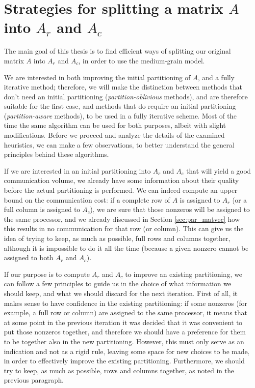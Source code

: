 \chapter{Strategies for splitting a matrix $A$ into $A_r$ and $A_c$} \label{chap:methods}

The main goal of this thesis is to find efficient ways of splitting our original matrix $A$ into $A_r$ and $A_c$, in order to use the medium-grain model.

We are interested in both improving the initial partitioning of $A$, and a fully iterative method; therefore, we will make the distinction between methods that don't need an initial partitioning (\emph{partition-oblivious} methods), and are therefore suitable for the first case, and methods that do require an initial partitioning (\emph{partition-aware} methods), to be used in a fully iterative scheme. Most of the time the same algorithm can be used for both purposes, albeit with slight modifications.  Before we proceed and analyze the details of the examined heuristics, we can make a few observations, to better understand the general principles behind these algorithms.

If we are interested in an initial partitioning into $A_r$ and $A_c$ that will yield a good communication volume, we already have some information about their quality before the actual partitioning is performed. We can indeed compute an upper bound on the communication cost: if a complete row of $A$ is assigned to $A_r$ (or a full column is assigned to $A_c$), we are sure that those nonzeros will be assigned to the same processor, and we already discussed in Section \ref{sec:par_matvec} how this results in no communication for that row (or column). This can give us the idea of trying to keep, as much as possible, full rows and columns together, although it is impossible to do it all the time (because a given nonzero cannot be assigned to both $A_r$ and $A_c$).

If our purpose is to compute $A_r$ and $A_c$ to improve an existing partitioning, we can follow a few principles to guide us in the choice of what information we should keep, and what we should discard for the next iteration. First of all, it makes sense to have confidence in the existing partitioning: if some nonzeros (for example, a full row or column) are assigned to the same processor, it means that at some point in the previous iteration it was decided that it was convenient to put those nonzeros together, and therefore we should have a preference for them to be together also in the new partitioning. However, this must only serve as an indication and not as a rigid rule, leaving some space for new choices to be made, in order to effectively improve the existing partitioning. Furthermore, we should try to keep, as much as possible, rows and columns together, as noted in the previous paragraph.

